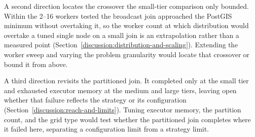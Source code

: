 A second direction locates the crossover the small-tier comparison only bounded. Within the 2--16 workers tested the broadcast join approached the PostGIS minimum without overtaking it, so the worker count at which distribution would overtake a tuned single node on a small join is an extrapolation rather than a measured point (Section~\ref{discussion:distribution-and-scaling}). Extending the worker sweep and varying the problem granularity would locate that crossover or bound it from above.

A third direction revisits the partitioned join. It completed only at the small tier and exhausted executor memory at the medium and large tiers, leaving open whether that failure reflects the strategy or its configuration (Section~\ref{discussion:reach-and-limits}). Tuning executor memory, the partition count, and the grid type would test whether the partitioned join completes where it failed here, separating a configuration limit from a strategy limit.